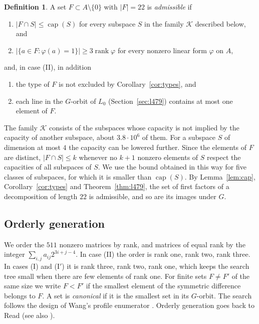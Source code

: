 \documentclass[11pt]{amsart}
\theoremstyle{definition}
\newtheorem{definition}[theorem]{Definition}
\theoremstyle{remark}
\numberwithin{equation}{section}
\newcommand{\rk}{\operatorname{rank}}
\newcommand{\cp}{\operatorname{cap}}
\newcommand{\cK}{\mathcal{K}}
\begin{document}
\begin{definition}\label{def:adm}
A set $F\subset A\setminus\{0\}$ with $|F|=22$ is \emph{admissible} if
\begin{enumerate}[label=(\alph*)]
\item $|F\cap S|\le\cp(S)$ for every subspace $S$ in the family $\cK$ described below, and
\item $|\{a\in F: \varphi(a)=1\}|\ge 3\rk\varphi$ for every nonzero linear form $\varphi$ on $A$,
\end{enumerate}
and, in case (II), in addition
\begin{enumerate}[label=(\alph*),resume]
\item the type of $F$ is not excluded by Corollary~\ref{cor:types}, and
\item each line in the $G$-orbit of $L_0$ (Section~\ref{sec:l479}) contains at most one element of $F$.
\end{enumerate}
\end{definition}

The family $\cK$ consists of the subspaces whose capacity is not implied by the capacity of another subspace, about $3.8\cdot 10^{6}$ of them. For a subspace $S$ of dimension at most $4$ the capacity can be lowered further. Since the elements of $F$ are distinct, $|F\cap S|\le k$ whenever no $k+1$ nonzero elements of $S$ respect the capacities of all subspaces of $S$. We use the bound obtained in this way for five classes of subspaces, for which it is smaller than $\cp(S)$. By Lemma~\ref{lem:cap}, Corollary~\ref{cor:types} and Theorem~\ref{thm:l479}, the set of first factors of a decomposition of length $22$ is admissible, and so are its images under $G$.

\subsection{Orderly generation}\label{subsec:orderly}
We order the $511$ nonzero matrices by rank, and matrices of equal rank by the integer $\sum_{i,j}a_{ij}2^{3i+j-4}$. In case (II) the order is rank one, rank two, rank three. In cases (I) and (I$'$) it is rank three, rank two, rank one, which keeps the search tree small when there are few elements of rank one. For finite sets $F\ne F'$ of the same size we write $F<F'$ if the smallest element of the symmetric difference belongs to $F$. A set is \emph{canonical} if it is the smallest set in its $G$-orbit. The search follows the design of Wang's profile enumerator \cite[\S3.3]{Wan26b}. Orderly generation goes back to Read \cite{Rea78} (see also \cite{McK98}).
\end{document}
